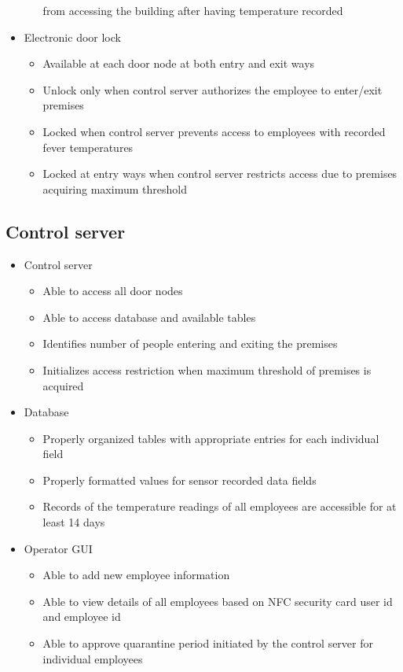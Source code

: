 \begin{itemize}
\begin{itemize}
              from accessing the building after having temperature recorded 
    \end{itemize}
    \item Electronic door lock
    \begin{itemize}
        \item Available at each door node at both entry and exit ways
        \item Unlock only when control server authorizes the employee to
              enter/exit premises
        \item Locked when control server prevents access to employees with
              recorded fever temperatures
        \item Locked at entry ways when control server restricts access due to
              premises acquiring maximum threshold
    \end{itemize}
\end{itemize}

\subsection{Control server}

\begin{itemize}
    \item Control server
    \begin{itemize}
        \item Able to access all door nodes
        \item Able to access database and available tables
        \item Identifies number of people entering and exiting the premises
        \item Initializes access restriction when maximum threshold of premises
              is acquired
    \end{itemize}
    \item Database
    \begin{itemize}
        \item Properly organized tables with appropriate entries for each
              individual field
        \item Properly formatted values for sensor recorded data fields
        \item Records of the temperature readings of all employees are
              accessible for at least 14 days 
    \end{itemize}
    \item Operator GUI
    \begin{itemize}
        \item Able to add new employee information
        \item Able to view details of all employees based on NFC security card
              user id and employee id
        \item Able to approve quarantine period initiated by the control server
              for individual employees
    \end{itemize}
\end{itemize}

